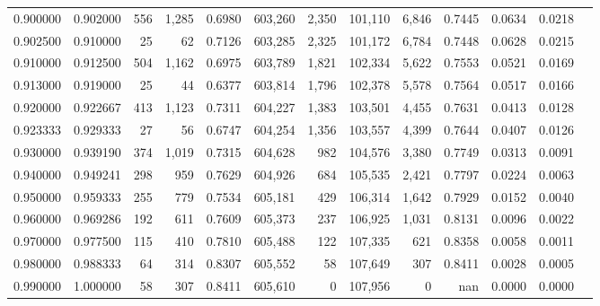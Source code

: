 \begin{tabular}{rrrrrrrrrrrrr}
0.900000 & 0.902000 &    556 & 1,285 &                                     0.6980 & 603,260 &   2,350 & 101,110 &   6,846 & 0.7445 & 0.0634 & 0.0218 \\
0.902500 & 0.910000 &     25 &    62 &                                     0.7126 & 603,285 &   2,325 & 101,172 &   6,784 & 0.7448 & 0.0628 & 0.0215 \\
0.910000 & 0.912500 &    504 & 1,162 &                                     0.6975 & 603,789 &   1,821 & 102,334 &   5,622 & 0.7553 & 0.0521 & 0.0169 \\
0.913000 & 0.919000 &     25 &    44 &                                     0.6377 & 603,814 &   1,796 & 102,378 &   5,578 & 0.7564 & 0.0517 & 0.0166 \\
0.920000 & 0.922667 &    413 & 1,123 &                                     0.7311 & 604,227 &   1,383 & 103,501 &   4,455 & 0.7631 & 0.0413 & 0.0128 \\
0.923333 & 0.929333 &     27 &    56 &                                     0.6747 & 604,254 &   1,356 & 103,557 &   4,399 & 0.7644 & 0.0407 & 0.0126 \\
0.930000 & 0.939190 &    374 & 1,019 &                                     0.7315 & 604,628 &     982 & 104,576 &   3,380 & 0.7749 & 0.0313 & 0.0091 \\
0.940000 & 0.949241 &    298 &   959 &                                     0.7629 & 604,926 &     684 & 105,535 &   2,421 & 0.7797 & 0.0224 & 0.0063 \\
0.950000 & 0.959333 &    255 &   779 &                                     0.7534 & 605,181 &     429 & 106,314 &   1,642 & 0.7929 & 0.0152 & 0.0040 \\
0.960000 & 0.969286 &    192 &   611 &                                     0.7609 & 605,373 &     237 & 106,925 &   1,031 & 0.8131 & 0.0096 & 0.0022 \\
0.970000 & 0.977500 &    115 &   410 &                                     0.7810 & 605,488 &     122 & 107,335 &     621 & 0.8358 & 0.0058 & 0.0011 \\
0.980000 & 0.988333 &     64 &   314 &                                     0.8307 & 605,552 &      58 & 107,649 &     307 & 0.8411 & 0.0028 & 0.0005 \\
0.990000 & 1.000000 &     58 &   307 &                                     0.8411 & 605,610 &       0 & 107,956 &       0 &    nan & 0.0000 & 0.0000 \\
\bottomrule
\end{tabular}
